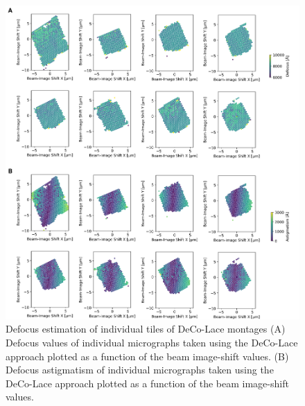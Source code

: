 \documentclass[
]{article}
\newenvironment{fignos:tagged-figure}[1][]{
    \let\oldthefigure\thefigure
    \let\oldtheHfigure\theHfigure
    \renewcommand{\thefigure}{#1}
    \renewcommand{\theHfigure}{#1}
  }{
    \let\thefigure\oldthefigure
    \let\theHfigure\oldtheHfigure
    \addtocounter{figure}{-1}
  }
\begin{document}
\begin{fignos:tagged-figure}

\begin{figure}
\hypertarget{fig:lamella_spatial_info}{%
\centering
\includegraphics{figures/lamella_spatial_info.png}
\caption{Defocus estimation of individual tiles of DeCo-Lace montages
(A) Defocus values of individual micrographs taken using the DeCo-Lace approach
plotted as a function of the beam image-shift values.
(B) Defocus astigmatism of individual micrographs taken using the DeCo-Lace approach
plotted as a function of the beam image-shift values.}\label{fig:lamella_spatial_info}
}
\end{figure}

\end{fignos:tagged-figure}
\end{document}
